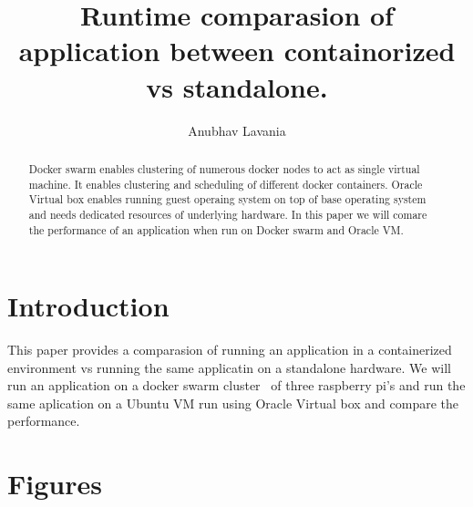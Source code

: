 
\title{Runtime comparasion of application between containorized vs standalone.}

\author{Anubhav Lavania}


\renewcommand{\shortauthors}{G. v. Laszewski}


\begin{abstract}
Docker swarm enables clustering of numerous docker nodes to act as
single virtual machine. It enables clustering and scheduling of
different docker containers. 
Oracle Virtual box enables running guest operaing system on top of
base operating system and needs dedicated resources of underlying
hardware.
In this paper we will comare the performance of an application when
run on Docker swarm and Oracle VM.

\end{abstract}



\maketitle


\section{Introduction}

This paper provides a comparasion of running an application in a
containerized environment vs running the same applicatin on a
standalone hardware. We will run an application on a docker swarm
cluster~\cite{hid-sp18-413-dockerswarm} of three raspberry pi's and
run the same aplication on a Ubuntu VM run using Oracle Virtual box and compare the performance.

\section{Figures}

